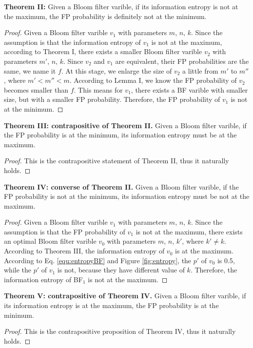 \textbf{Theorem II:} Given a Bloom filter varible, if its information entropy is not at the maximum, the FP probability is definitely not at the minimum.
\begin{proof}
Given a Bloom filter varible $v_1$ with parameters $m$, $n$, $k$. Since the assumption is that the information entropy of $v_1$ is not at the maximum, according to Theorem I, there exists a smaller Bloom filter varible $v_2$ with parameters $m'$, $n$, $k$. Since $v_2$ and $v_1$ are equivalent, their FP probabilities are the same, we name it $f$.
At this stage, we enlarge the size of $v_2$ a little from $m'$ to $m''$, where $m'<m''<m$. According to Lemma I, we know the FP probability of $v_2$ becomes smaller than $f$. This means for $v_1$, there exists a BF varible with smaller size, but with a smaller FP probability. Therefore, the FP probability of $v_1$ is not at the minimum.
\end{proof}


\textbf{Theorem III: contrapositive of Theorem II.} Given a Bloom filter varible, if the FP probability is at the minimum, its information entropy must be at the maximum.
\begin{proof}
This is the contrapositive statement of Theorem II, thus it naturally holds.
\end{proof}

\textbf{Theorem IV: converse of Theorem II.} Given a Bloom filter varible, if the FP probability is not at the minimum, its information entropy must be not at the maximum.
\begin{proof}
Given a Bloom filter varible $v_1$ with parameters $m$, $n$, $k$. Since the assumption is that the FP probability of $v_1$ is not at the maximum, there exists an optimal Bloom filter varible $v_0$ with parameters $m$, $n$, $k'$, where $k'\neq k$. According to Theorem III, the information entropy of $v_0$ is at the maximum. According to Eq. \ref{equ:entropyBF} and Figure \ref{fig:entropy}, the $p'$ of $v_0$ is 0.5, while the $p'$ of $v_1$ is not, because they have different value of $k$. Therefore, the information entropy of BF$_1$ is not at the maximum.
\end{proof}


\textbf{Theorem V: contrapositive of Theorem IV.} Given a Bloom filter varible, if its information entropy is at the maximum, the FP probability is at the minimum. 
\begin{proof}
This is the contrapositive proposition of Theorem IV, thus it naturally holds.
\end{proof}



